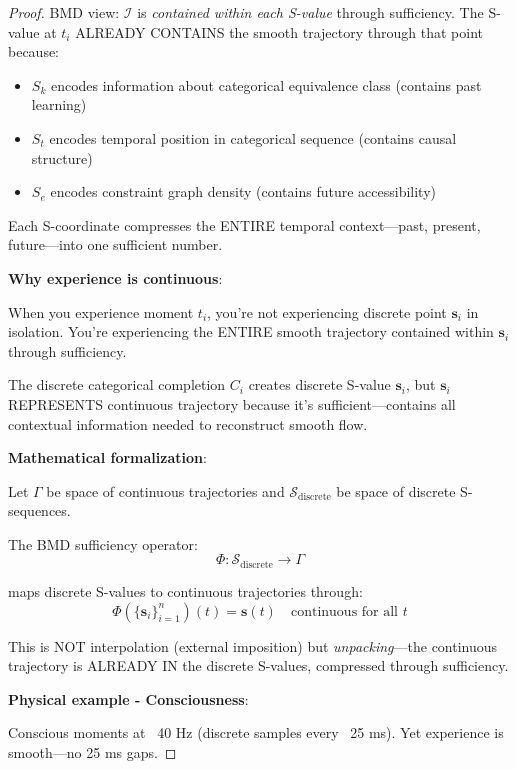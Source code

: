 \documentclass[12pt,a4paper]{article}
\begin{document}
\begin{proof}
BMD view: $\mathcal{I}$ is \textit{contained within each S-value} through sufficiency. The S-value at $t_i$ ALREADY CONTAINS the smooth trajectory through that point because:

\begin{itemize}
\item $S_k$ encodes information about categorical equivalence class (contains past learning)
\item $S_t$ encodes temporal position in categorical sequence (contains causal structure)  
\item $S_e$ encodes constraint graph density (contains future accessibility)
\end{itemize}

Each S-coordinate compresses the ENTIRE temporal context—past, present, future—into one sufficient number.

\textbf{Why experience is continuous}:

When you experience moment $t_i$, you're not experiencing discrete point $\mathbf{s}_i$ in isolation. You're experiencing the ENTIRE smooth trajectory contained within $\mathbf{s}_i$ through sufficiency.

The discrete categorical completion $C_i$ creates discrete S-value $\mathbf{s}_i$, but $\mathbf{s}_i$ REPRESENTS continuous trajectory because it's sufficient—contains all contextual information needed to reconstruct smooth flow.

\textbf{Mathematical formalization}:

Let $\Gamma$ be space of continuous trajectories and $\mathcal{S}_{\text{discrete}}$ be space of discrete S-sequences.

The BMD sufficiency operator:
\begin{equation}
\Phi: \mathcal{S}_{\text{discrete}} \to \Gamma
\end{equation}

maps discrete S-values to continuous trajectories through:
\begin{equation}
\Phi(\{\mathbf{s}_i\}_{i=1}^n)(t) = \mathbf{s}(t) \quad \text{continuous for all } t
\end{equation}

This is NOT interpolation (external imposition) but \textit{unpacking}—the continuous trajectory is ALREADY IN the discrete S-values, compressed through sufficiency.

\textbf{Physical example - Consciousness}:

Conscious moments at ~40 Hz (discrete samples every ~25 ms). Yet experience is smooth—no 25 ms gaps.


\end{proof}
\end{document}
